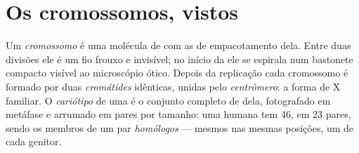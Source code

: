 \section{Os cromossomos, vistos}

\begin{definition}\label{def:g11:cell-cycle-mitosis:chromosome}
Um \emph{cromossomo} é uma molécula de  com as  de
empacotamento dela. Entre duas divisões ele é um fio frouxo e
invisível; no início da  ele se espirala num bastonete compacto
visível ao microscópio ótico. Depois da replicação cada cromossomo é
formado por duas \emph{cromátides} idênticas, unidas
pelo \emph{centrômero}: a forma de X familiar. O
\emph{cariótipo} de uma  é o conjunto completo
de  dela, fotografado em metáfase e arrumado em pares por
tamanho: uma  humana tem 46, em 23 pares, sendo os membros de um
par \emph{homólogos} --- mesmos  nas mesmas posições, um de cada
genitor.
\end{definition}

